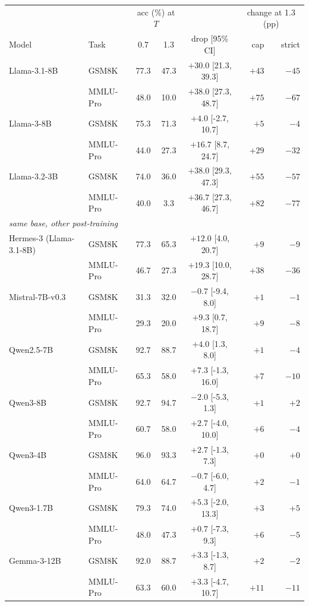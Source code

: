 \begin{tabular}{llcccrr}
\toprule
 & & \multicolumn{2}{c}{acc (\%) at $T$} & & \multicolumn{2}{c}{change at 1.3 (pp)} \\
Model & Task & 0.7 & 1.3 & drop [95\% CI] & cap & strict \\
Llama-3.1-8B & GSM8K & 77.3 & 47.3 & $\mathbf{+30.0}$ [21.3, 39.3] & $+43$ & $-45$ \\
 & MMLU-Pro & 48.0 & 10.0 & $\mathbf{+38.0}$ [27.3, 48.7] & $+75$ & $-67$ \\
Llama-3-8B & GSM8K & 75.3 & 71.3 & $+4.0$ [-2.7, 10.7] & $+5$ & $-4$ \\
 & MMLU-Pro & 44.0 & 27.3 & $+16.7$ [8.7, 24.7] & $+29$ & $-32$ \\
Llama-3.2-3B & GSM8K & 74.0 & 36.0 & $\mathbf{+38.0}$ [29.3, 47.3] & $+55$ & $-57$ \\
 & MMLU-Pro & 40.0 & 3.3 & $\mathbf{+36.7}$ [27.3, 46.7] & $+82$ & $-77$ \\
\midrule
\multicolumn{7}{l}{\emph{same base, other post-training}} \\
Hermes-3 (Llama-3.1-8B) & GSM8K & 77.3 & 65.3 & $+12.0$ [4.0, 20.7] & $+9$ & $-9$ \\
 & MMLU-Pro & 46.7 & 27.3 & $+19.3$ [10.0, 28.7] & $+38$ & $-36$ \\
\midrule
Mistral-7B-v0.3 & GSM8K & 31.3 & 32.0 & $-0.7$ [-9.4, 8.0] & $+1$ & $-1$ \\
 & MMLU-Pro & 29.3 & 20.0 & $+9.3$ [0.7, 18.7] & $+9$ & $-8$ \\
Qwen2.5-7B & GSM8K & 92.7 & 88.7 & $+4.0$ [1.3, 8.0] & $+1$ & $-4$ \\
 & MMLU-Pro & 65.3 & 58.0 & $+7.3$ [-1.3, 16.0] & $+7$ & $-10$ \\
Qwen3-8B & GSM8K & 92.7 & 94.7 & $-2.0$ [-5.3, 1.3] & $+1$ & $+2$ \\
 & MMLU-Pro & 60.7 & 58.0 & $+2.7$ [-4.0, 10.0] & $+6$ & $-4$ \\
Qwen3-4B & GSM8K & 96.0 & 93.3 & $+2.7$ [-1.3, 7.3] & $+0$ & $+0$ \\
 & MMLU-Pro & 64.0 & 64.7 & $-0.7$ [-6.0, 4.7] & $+2$ & $-1$ \\
Qwen3-1.7B & GSM8K & 79.3 & 74.0 & $+5.3$ [-2.0, 13.3] & $+3$ & $+5$ \\
 & MMLU-Pro & 48.0 & 47.3 & $+0.7$ [-7.3, 9.3] & $+6$ & $-5$ \\
Gemma-3-12B & GSM8K & 92.0 & 88.7 & $+3.3$ [-1.3, 8.7] & $+2$ & $-2$ \\
 & MMLU-Pro & 63.3 & 60.0 & $+3.3$ [-4.7, 10.7] & $+11$ & $-11$ \\

\end{tabular}
